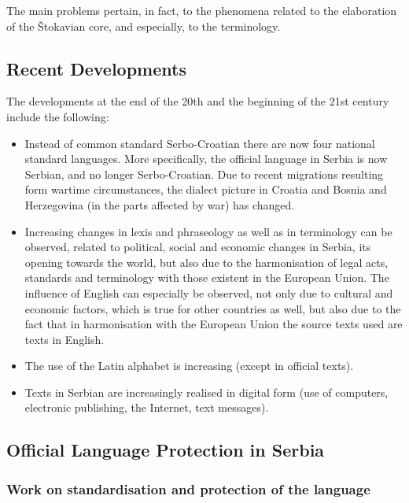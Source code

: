 \begin{multicols}{2}

The main problems pertain, in fact, to the phenomena related to the elaboration of the Štokavian core, and especially, to the terminology.

\subsection{Recent Developments}


The developments at the end of the 20th and the beginning of the 21st century include the following:
\begin{itemize}
 \item Instead of common standard Serbo-Croatian there are now four national standard languages. More specifically, the official language in Serbia is now Serbian, and no longer Serbo-Croatian.  Due to recent migrations resulting form wartime circumstances, the dialect picture in Croatia and Bosnia and Herzegovina (in the parts affected by war) has changed. 
\item Increasing changes in lexis and phraseology as well as in terminology can be observed, related to political, social and economic changes in Serbia, its opening towards the world, but also due to the harmonisation of legal acts, standards and terminology with those existent in the European Union. The influence of English can especially be observed, not only due to cultural and economic factors, which is true for other countries as well, but also due to the fact that in harmonisation with the European Union the source texts used are texts in English. 
\item The use of the Latin alphabet is increasing (except in official texts). 
\item Texts in Serbian are increasingly realised in digital form (use of computers, electronic publishing, the Internet, text messages). 
\end{itemize}

\subsection {Official Language Protection in Serbia}

\subsubsection{Work on standardisation and protection of the language}   


\end{multicols}
